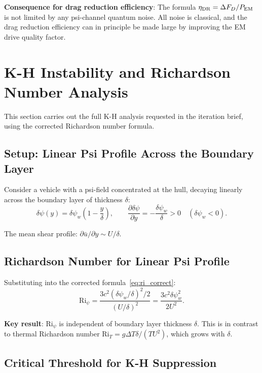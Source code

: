 \documentclass[11pt,twocolumn]{article}
\newcommand{\dpsi}{\delta\psi}
\newcommand{\Ri}{\mathrm{Ri}}
\begin{document}
\textbf{Consequence for drag reduction efficiency}: The formula
$\eta_{\rm DR} = \Delta F_D / P_{\rm EM}$ is not limited by any psi-channel
quantum noise. All noise is classical, and the drag reduction efficiency
can in principle be made large by improving the EM drive quality factor.

\section{K-H Instability and Richardson Number Analysis}
\label{sec:KH}

This section carries out the full K-H analysis requested in the iteration
brief, using the corrected Richardson number formula.

\subsection{Setup: Linear Psi Profile Across the Boundary Layer}

Consider a vehicle with a psi-field concentrated at the hull, decaying linearly
across the boundary layer of thickness $\delta$:
\begin{equation}
\dpsi(y) = \dpsi_w\!\left(1 - \frac{y}{\delta}\right), \qquad
\frac{\partial\dpsi}{\partial y} = -\frac{\dpsi_w}{\delta} > 0
\quad (\dpsi_w < 0).
\end{equation}

The mean shear profile: $\partial\bar{u}/\partial y \sim U/\delta$.

\subsection{Richardson Number for Linear Psi Profile}

Substituting into the corrected formula~\eqref{eq:ri_correct}:
\begin{equation}
\Ri_\psi = \frac{3c^2(\dpsi_w/\delta)^2/2}{(U/\delta)^2}
= \frac{3c^2\dpsi_w^2}{2U^2}.
\label{eq:ri_bl}
\end{equation}

\textbf{Key result}: $\Ri_\psi$ is independent of boundary layer thickness
$\delta$. This is in contrast to thermal Richardson number $\Ri_T = g\Delta T
\delta/(T U^2)$, which grows with $\delta$.

\subsection{Critical Threshold for K-H Suppression}
\end{document}
